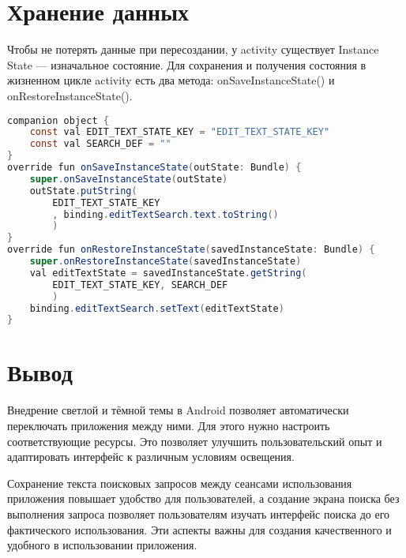 \section{Хранение данных}

Чтобы не потерять данные при пересоздании, у activity существует
Instance State --- изначальное состояние. Для сохранения и получения
состояния в жизненном цикле activity есть два метода: onSaveInstanceState() и
onRestoreInstanceState().

\begin{lstlisting}[language=Java]
companion object {
	const val EDIT_TEXT_STATE_KEY = "EDIT_TEXT_STATE_KEY"
	const val SEARCH_DEF = ""
}
override fun onSaveInstanceState(outState: Bundle) {
	super.onSaveInstanceState(outState)
	outState.putString(
		EDIT_TEXT_STATE_KEY
		, binding.editTextSearch.text.toString()
		)
}
override fun onRestoreInstanceState(savedInstanceState: Bundle) {
	super.onRestoreInstanceState(savedInstanceState)
	val editTextState = savedInstanceState.getString(
		EDIT_TEXT_STATE_KEY, SEARCH_DEF
		)
	binding.editTextSearch.setText(editTextState)
}
\end{lstlisting}

\clearpage

\section*{\LARGE Вывод}

Внедрение светлой и тёмной темы в Android позволяет автоматически переключать
приложения между ними. Для этого нужно настроить соответствующие ресурсы.
Это позволяет улучшить пользовательский опыт
и адаптировать интерфейс к различным условиям освещения.\par
Сохранение текста поисковых запросов между сеансами использования
приложения повышает удобство для пользователей,
а создание экрана поиска без выполнения запроса позволяет пользователям
изучать интерфейс поиска до его фактического использования.
Эти аспекты важны для создания качественного
и удобного в использовании приложения.

